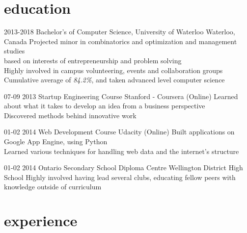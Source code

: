 \documentclass[]{friggeri-cv}
\newcommand{\imp}[1] {{\em #1}}
\begin{document}
\section{education}

\begin{entrylist}
  \entry
    {2013-2018}
    {Bachelor's of Computer Science, University of Waterloo}
    {Waterloo, Canada}
	{Projected minor in combinatorics and optimization and management studies \\
	\hspace*{4mm}based on interests of entrepreneurship and problem solving \\
	Highly involved in campus volunteering, events and collaboration groups \\ Cumulative average of \imp{84.2\%}, and taken advanced level computer science}
	
  \entry
  	{07-09 2013}
  	{Startup Engineering Course}
  	{Stanford - Coursera (Online)}
  	{Learned about what it takes to develop an idea from a business perspective \\
  	Discovered methods behind innovative work}
  	
  \entry
  	{01-02 2014}
  	{Web Development Course}
  	{Udacity (Online)}
  	{Built applications on Google App Engine, using Python \\
  	Learned various techniques for handling web data and the internet's structure}
  	
  \entry
  	{01-02 2014}
  	{Ontario Secondary School Diploma}
  	{Centre Wellington District High School}
    {Highly involved having lead several clubs, educating fellow peers with knowledge outside of curriculum \\
    }
\end{entrylist}

\section{experience}
\end{document}
